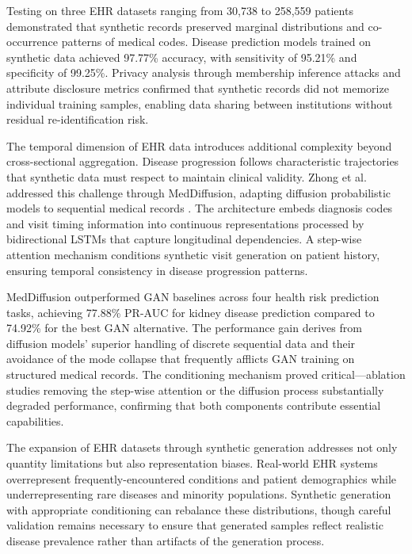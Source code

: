 Testing on three EHR datasets ranging from 30,738 to 258,559 patients demonstrated that synthetic records preserved marginal distributions and co-occurrence patterns of medical codes. Disease prediction models trained on synthetic data achieved 97.77\% accuracy, with sensitivity of 95.21\% and specificity of 99.25\%. Privacy analysis through membership inference attacks and attribute disclosure metrics confirmed that synthetic records did not memorize individual training samples, enabling data sharing between institutions without residual re-identification risk.

The temporal dimension of EHR data introduces additional complexity beyond cross-sectional aggregation. Disease progression follows characteristic trajectories that synthetic data must respect to maintain clinical validity. Zhong et al. addressed this challenge through MedDiffusion, adapting diffusion probabilistic models to sequential medical records \cite{zhong2024meddiffusion}. The architecture embeds diagnosis codes and visit timing information into continuous representations processed by bidirectional LSTMs that capture longitudinal dependencies. A step-wise attention mechanism conditions synthetic visit generation on patient history, ensuring temporal consistency in disease progression patterns.

MedDiffusion outperformed GAN baselines across four health risk prediction tasks, achieving 77.88\% PR-AUC for kidney disease prediction compared to 74.92\% for the best GAN alternative. The performance gain derives from diffusion models' superior handling of discrete sequential data and their avoidance of the mode collapse that frequently afflicts GAN training on structured medical records. The conditioning mechanism proved critical---ablation studies removing the step-wise attention or the diffusion process substantially degraded performance, confirming that both components contribute essential capabilities.

The expansion of EHR datasets through synthetic generation addresses not only quantity limitations but also representation biases. Real-world EHR systems overrepresent frequently-encountered conditions and patient demographics while underrepresenting rare diseases and minority populations. Synthetic generation with appropriate conditioning can rebalance these distributions, though careful validation remains necessary to ensure that generated samples reflect realistic disease prevalence rather than artifacts of the generation process.

